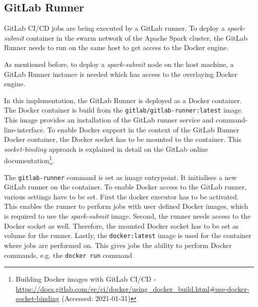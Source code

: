 \subsection{GitLab Runner}
GitLab CI/CD jobs are being executed by a GitLab runner.
To deploy a \textit{spark-submit} container in the swarm network of the Apache Spark cluster, the GitLab Runner needs to run on the same host to get access to the Docker engine.


%
As mentioned before, to deploy a \textit{spark-submit} node on the host machine, a GitLab Runner instance is needed which has access to the overlaying Docker engine.


In this implementation, the GitLab Runner is deployed as a Docker container.
The Docker container is build from the \texttt{gitlab/gitlab-runner:latest} image. This image provides an installation of the GitLab runner service and command-line-interface.
To enable Docker support in the context of the GitLab Runner Docker container, the Docker socket has to be mounted to the container. This \textit{socket-binding} approach is explained in detail on the GitLab online documentation\footnote{Building Docker images with GitLab CI/CD  - \url{https://docs.gitlab.com/ee/ci/docker/using_docker_build.html\#use-docker-socket-binding} (Accessed: 2021-01-31)}.


The \texttt{gitlab-runner} command is set as image entrypoint. It initialises a new GitLab runner on the container.
To enable Docker access to the GitLab runner, various settings have to be set. First the docker executor has to be activated. This enables the runner to perform jobs with user defined Docker images, which is required to use the \textit{spark-submit} image. Second, the runner needs access to the Docker socket as well. Therefore, the mounted Docker socket has to be set as volume for the runner. Lastly, the \texttt{docker:latest} image is used for the container where jobs are performed on. This gives jobs the ability to perform Docker commands, e.g. the \texttt{docker run} command


